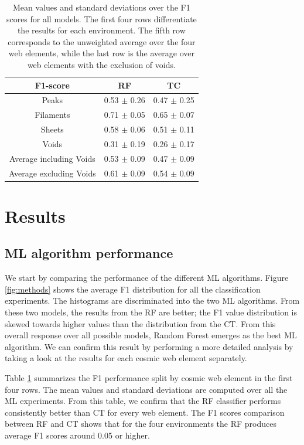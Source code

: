 \documentclass[usenatbib]{mnras}
\begin{document}
\begin{table}
\centering
\begin{tabular}{ccc}
\hline
 F1-score                   & RF              & TC              \\
\hline
 Peaks              & 0.53 $\pm$ 0.26 & 0.47 $\pm$ 0.25 \\
 Filaments          & 0.71 $\pm$ 0.05 & 0.65 $\pm$ 0.07 \\
 Sheets            & 0.58 $\pm$ 0.06 & 0.51 $\pm$ 0.11 \\
 Voids               & 0.31 $\pm$ 0.19 & 0.26 $\pm$ 0.17 \\
 Average including Voids    & 0.53 $\pm$ 0.09 & 0.47 $\pm$ 0.09 \\
 Average excluding Voids & 0.61 $\pm$ 0.09 & 0.54 $\pm$ 0.09 \\
\hline
\end{tabular}
\caption{Mean values and standard deviations 
  over the F1 scores for all models.
  The first four rows differentiate the results for each environment.
  The fifth row corresponds to the unweighted average over the four web elements, while the last row is the average over web elements with the exclusion of voids.}
\label{table:elements}
\end{table}


\section{Results}\label{sec:results}

\subsection{ML algorithm performance}


We start by comparing the performance of the different ML algorithms.
Figure \ref{fig:methods} shows the average F1 distribution for
all the classification experiments.
The histograms are discriminated into the two ML algorithms.
From these two models, the results from the RF are better; the F1 value distribution is skewed towards higher values than the distribution from the CT.
From this overall response over all possible models, Random Forest
emerges as the best ML algorithm.
We can confirm this result by performing a more detailed analysis by
taking a look at the results for each cosmic web element separately.

Table \ref{table:elements} summarizes the F1 performance split by cosmic
web element in the first four rows.
The mean values and standard deviations are computed over all the ML experiments. 
From this table, we confirm that the RF classifier performs
consistently better than CT for every web element.
The F1 scores comparison between RF and CT shows that for the four environments the RF produces average F1 scores around 0.05 or higher. 
\end{document}
